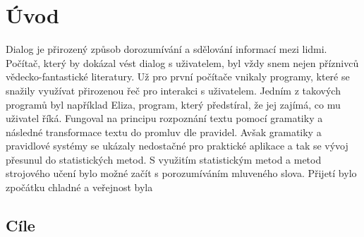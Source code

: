 \chapter*{Úvod}

Dialog je přirozený způsob dorozumívání a sdělování informací mezi lidmi.
Počítač, který by dokázal vést dialog s uživatelem, byl vždy snem nejen
příznivců vědecko-fantastické literatury.
Už pro první počítače vnikaly programy, které se snažily využívat přirozenou
řeč pro interakci s uživatelem.
Jedním z takových programů byl například Eliza, program, který předstíral, že
jej zajímá, co mu uživatel říká.
Fungoval na principu rozpoznání textu pomocí gramatiky a následné transformace
textu do promluv dle pravidel.
Avšak gramatiky a pravidlové systémy se ukázaly nedostačné pro praktické
aplikace a tak se vývoj přesunul do statistických metod.
S využitím statistickým metod a metod strojového učení bylo možné začít s
porozumíváním mluveného slova.
Přijetí bylo zpočátku chladné a veřejnost byla 

\section*{Cíle}

